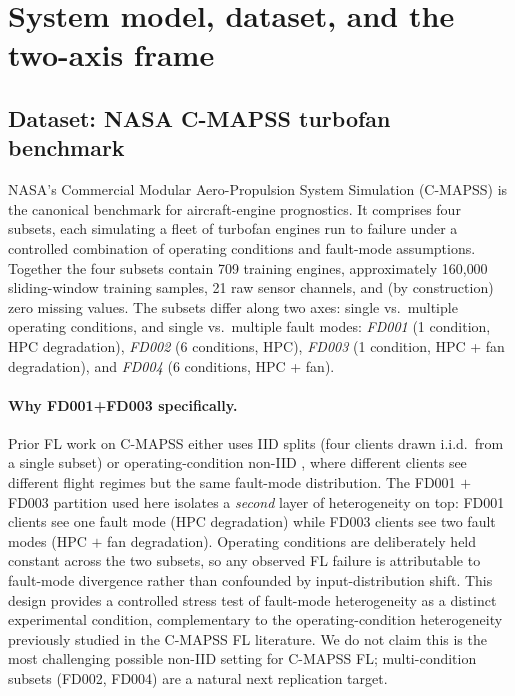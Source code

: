 \documentclass[preprint,12pt,authoryear]{elsarticle}
\begin{document}

\section{System model, dataset, and the two-axis frame}
\label{sec:system}

\subsection{Dataset: NASA C-MAPSS turbofan benchmark}
\label{subsec:dataset}

NASA's Commercial Modular Aero-Propulsion System Simulation
(C-MAPSS) \citep{Saxena2008CMAPSS} is the canonical benchmark for
aircraft-engine prognostics. It comprises four subsets, each
simulating a fleet of turbofan engines run to failure under a
controlled combination of operating conditions and fault-mode
assumptions. Together the four subsets contain 709 training engines,
approximately 160{,}000 sliding-window training samples, 21 raw
sensor channels, and (by construction) zero missing values.
The subsets differ along two axes: single vs.\ multiple operating
conditions, and single vs.\ multiple fault modes:
\emph{FD001} (1 condition, HPC degradation), \emph{FD002}
(6 conditions, HPC), \emph{FD003} (1 condition, HPC + fan
degradation), and \emph{FD004} (6 conditions, HPC + fan).

\paragraph{Why FD001+FD003 specifically.}
Prior FL work on C-MAPSS either uses IID splits (four clients drawn
i.i.d.\ from a single subset) or operating-condition non-IID
\citep{Pandhare2021FederatedBaseline}, where different clients see
different flight regimes but the same fault-mode distribution. The
FD001 $+$ FD003 partition used here isolates a \emph{second} layer
of heterogeneity on top: FD001 clients see one fault mode
(HPC degradation) while FD003 clients see two fault modes (HPC $+$
fan degradation). Operating conditions are deliberately held
constant across the two subsets, so any observed FL failure is
attributable to fault-mode divergence rather than confounded by
input-distribution shift. This design provides a controlled stress
test of fault-mode heterogeneity as a distinct experimental
condition, complementary to the operating-condition heterogeneity
previously studied in the C-MAPSS FL literature. We do not claim
this is the most challenging possible non-IID setting for C-MAPSS
FL; multi-condition subsets (FD002, FD004) are a natural next
replication target.
\end{document}
